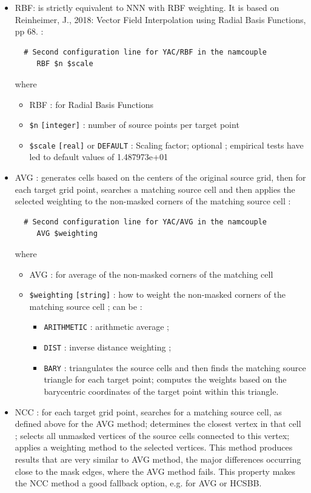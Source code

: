 \begin{itemize}
\item RBF: is strictly equivalent to NNN with RBF weighting.  It is based on \newline Reinheimer, J., 2018: Vector Field Interpolation using Radial Basis Functions, pp 68. :
\begin{verbatim}
  # Second configuration line for YAC/RBF in the namcouple
     RBF $n $scale  
\end{verbatim}
where
   \begin{itemize}
   \item RBF : for Radial Basis Functions
   \item {\tt \$n} {\tt [integer]} : number of source points per target point
   \item  {\tt \$scale} {\tt [real]} or {\tt DEFAULT} : Scaling factor; optional ; empirical tests have led to default values of 1.487973e+01
   \end{itemize}
   
\item AVG : generates cells based on the centers of the original source grid, then for each target grid point, searches a matching source cell and  then applies the selected weighting to the non-masked corners of
the matching source cell :
\begin{verbatim}
  # Second configuration line for YAC/AVG in the namcouple
     AVG $weighting
\end{verbatim}
where
\begin{itemize}
\item AVG : for average of the non-masked corners of the matching cell
\item {\tt \$weighting} {\tt [string]} : how to weight the non-masked corners of the matching source cell  ; can be :
   \begin{itemize}
   \item {\tt ARITHMETIC} : arithmetic average ;
   \item {\tt DIST} : inverse distance weighting ;
   \item {\tt BARY} : triangulates the source cells and then finds the matching source triangle for each target point; computes the weights based on the barycentric coordinates of the target point within this triangle.
   \end{itemize} 
\end{itemize} 

\item NCC :  for each target grid point, searches for a matching source cell, as defined above for the AVG
method; determines the closest vertex in that cell ; selects all unmasked vertices of the source cells connected to this vertex; applies a weighting method to the selected vertices.
This method produces results that are very similar to AVG method, the major differences occurring
close to the mask edges, where the AVG method fails. This property makes the NCC method a
good fallback option, e.g. for AVG or HCSBB.


\end{itemize}
